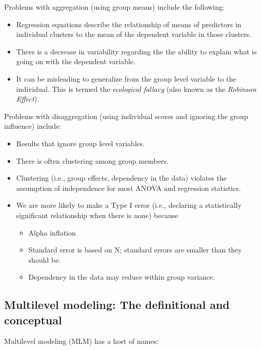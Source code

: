\documentclass[
  english,
]{book}
\providecommand{\tightlist}{%
  \setlength{\itemsep}{0pt}\setlength{\parskip}{0pt}}
\begin{document}
Problems with aggregation (using group means) include the following:

\begin{itemize}
\tightlist
\item
  Regression equations describe the relationship of means of predictors in individual clusters to the mean of the dependent variable in those clusters.
\item
  There is a decrease in variability regarding the the ability to explain what is going on with the dependent variable.
\item
  It can be misleading to generalize from the group level variable to the individual. This is termed the \emph{ecological fallacy} (also known as the \emph{Robinson Effect}).
\end{itemize}

Problems with disaggregation (using individual scores and ignoring the group influence) include:

\begin{itemize}
\tightlist
\item
  Results that ignore group level variables.
\item
  There is often clustering among group members.
\item
  Clustering (i.e., group effects, dependency in the data) violates the assumption of independence for most ANOVA and regression statistics.
\item
  We are more likely to make a Type I error (i.e., declaring a statistically significant relationship when there is none) because

  \begin{itemize}
  \tightlist
  \item
    Alpha inflation
  \item
    Standard error is based on N; standard errors are smaller than they should be.
  \item
    Dependency in the data may reduce within group variance.
  \end{itemize}
\end{itemize}

\hypertarget{multilevel-modeling-the-definitional-and-conceptual}{%
\subsection{Multilevel modeling: The definitional and conceptual}\label{multilevel-modeling-the-definitional-and-conceptual}}

Multilevel modeling (MLM) has a host of names:
\end{document}
